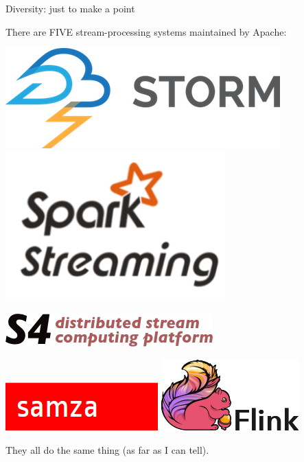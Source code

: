 \documentclass{beamer}
\begin{document}
\begin{frame}{Diversity: just to make a point}

There are FIVE stream-processing systems maintained by Apache:

\begin{center}
\begin{minipage}{0.8\linewidth}
\begin{center}
\includegraphics[width=0.4\linewidth]{streaming-1.png} \hfill
\includegraphics[width=0.4\linewidth]{streaming-2.png}

\vspace{0.2 cm}
\includegraphics[width=0.5\linewidth]{streaming-3.png}

\vspace{0.2 cm}
\includegraphics[width=0.4\linewidth]{streaming-4.png} \hfill
\includegraphics[width=0.4\linewidth]{streaming-5.jpg}
\end{center}
\end{minipage}
\end{center}

\vfill
They all do the same thing (as far as I can tell).
\end{frame}
\end{document}
